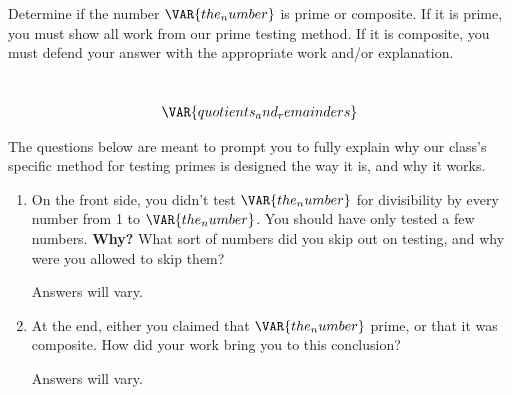 
Determine if the number $\VAR{the_number}$ is prime or composite. If it is prime, you must show all work from our prime testing method. If it is composite, you must defend your answer with the appropriate work and/or explanation.\\

\begin{ansenv}
    \\
    \begin{align*}
        \VAR{quotients_and_remainders}
    \end{align*}
\end{ansenv}

\newpage


The questions below are meant to prompt you to fully explain why our class's specific method for testing primes is designed the way it is, and why it works. 

\begin{enumerate}

    \item On the front side, you didn't test $\VAR{the_number}$ for divisibility by every number from 1 to $\VAR{the_number}$. You should have only tested a few numbers. \textbf{Why?} What sort of numbers did you skip out on testing, and why were you allowed to skip them?

    \vfill
    \begin{ansenv}
        Answers will vary.
    \end{ansenv}
    \vfill

    \item At the end, either you claimed that $\VAR{the_number}$ prime, or that it was composite. How did your work bring you to this conclusion?

    \vfill
    \begin{ansenv}
        Answers will vary.
    \end{ansenv}
    \vfill
\end{enumerate}

